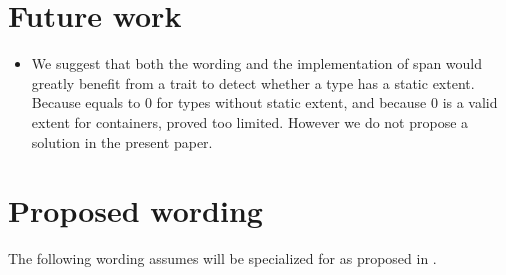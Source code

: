 \documentclass{wg21}
\begin{document}
\section{Future work}

\begin{itemize}
	\item We suggest that both the wording and the implementation of span would greatly benefit from a trait to detect whether a type has a static extent.
Because  equals to 0 for types without static extent, and because 0 is a valid extent for containers,  proved too limited. However we do not propose a solution in the present paper.
\end{itemize}

\section{Proposed wording}


The following wording assumes  will be specialized for  as proposed
in \cite{P1474}.  
\end{document}
